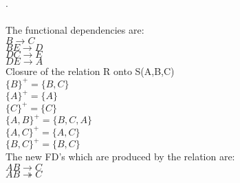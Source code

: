 . \\ \\
The functional dependencies are:\\
$B \rightarrow C$\\
$BE \rightarrow D$\\
$DC \rightarrow E$\\
$DE \rightarrow A$\\

Closure of the relation R onto S(A,B,C)\\
$\{B\}^+ = \{ B,C\}$ \\
$\{A\}^+ = \{ A\}$ \\
$\{C\}^+ = \{ C\}$ \\
$\{A,B\}^+ = \{ B,C,A\}$ \\
$\{A,C\}^+ = \{ A,C\}$ \\
$\{B,C\}^+ = \{ B,C\}$ \\


The new FD's which are produced by the relation are:\\
$AB \rightarrow C$\\
$AB \twoheadrightarrow C$
